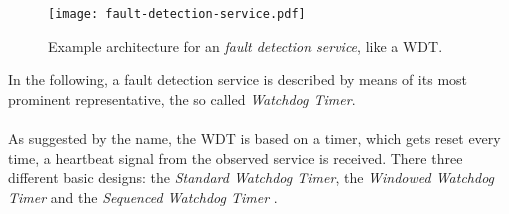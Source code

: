 \begin{figure}[ht]
\centering
\texttt{[image: fault-detection-service.pdf]}
\caption{Example architecture for an \emph{fault detection service}, like a WDT.}
\label{fig:fault-detection-service}
\end{figure}

In the following, a fault detection service is described by means of its most prominent representative, the so called \emph{Watchdog Timer}.
\\
\\
As suggested by the name, the WDT is based on a timer, which gets reset every time, a heartbeat signal from the observed service is received. There three different basic designs: the \emph{Standard Watchdog Timer}, the \emph{Windowed Watchdog Timer} and the \emph{Sequenced Watchdog Timer} \cite{elattar2007}.


